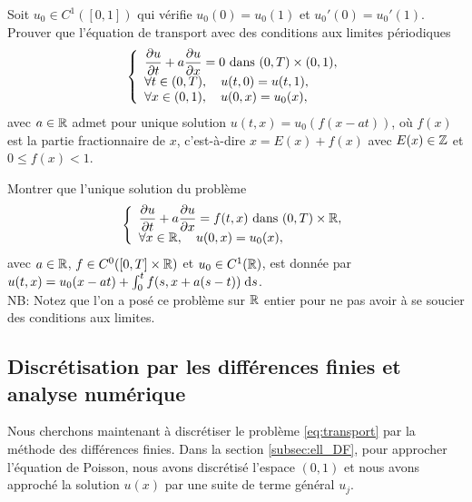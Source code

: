 \documentclass[12pt,a4paper,twoside]{article}
\begin{document}
\begin{exercise}
  \label{exo:carac_per}
  Soit $u_0 \in C^1([0,1])$ qui v\'erifie $u_0(0) = u_0(1)$ et $u_0'(0) = u_0'(1)$.
  Prouver que l'\'equation de transport avec des conditions aux limites p\'eriodiques
  \begin{equation}
    \label{eq:transport_per}
    \left\{
      \begin{array}{l}
        \dfrac{\partial u}{\partial t} + a \dfrac{\partial u}{\partial x} = 0 
        \text{ dans } (0,T) \times (0,1),
        \\
        \forall t \in (0,T), \quad u(t,0) = u(t,1) ,
        \\
        \forall x \in (0,1), \quad u(0,x) = u_0(x) ,
      \end{array}
    \right.
  \end{equation}
  avec $a\in \mathbb{R}$
  admet pour unique solution $u(t,x) = u_0(f(x-at))$,
  o\`u $f(x)$ est la partie fractionnaire de $x$,
  c'est-\`a-dire $x = E(x) + f(x)$ avec $E(x) \in \mathbb{Z}$
  et $0 \leq f(x) < 1$.
\end{exercise}

\begin{exercise}
  Montrer que l'unique solution du probl\`eme
  \begin{equation*}
    \left\{
      \begin{array}{l}
        \dfrac{\partial u}{\partial t} + a \dfrac{\partial u}{\partial x} = f(t,x)
        \text{ dans } (0,T) \times \mathbb{R},
        \\
        \forall x \in \mathbb{R}, \quad u(0,x) = u_0(x) ,
      \end{array}
    \right.
  \end{equation*}
  avec $a \in \mathbb{R}$, $f \in C^0([0,T] \times \mathbb{R})$ et $u_0 \in C^1(\mathbb{R})$,
  est donn\'ee par 
  $u(t,x) = u_0(x-at) + \int_0^t f(s,x+a(s-t)) \;\mathrm{d} s$.
  \\
  NB: Notez que l'on a pos\'e ce probl\`eme sur $\mathbb{R}$ entier pour ne pas avoir
  \`a se soucier des conditions aux limites.
\end{exercise}

\subsection{Discr\'etisation par les diff\'erences finies et analyse num\'erique}
\label{subsec:transport_DF}

Nous cherchons maintenant \`a discr\'etiser le probl\`eme \eqref{eq:transport}
par la m\'ethode des diff\'erences finies.
Dans la section \ref{subsec:ell_DF}, pour approcher l'\'equation de Poisson,
nous avons discr\'etis\'e l'espace $(0,1)$ et nous avons approch\'e la solution
$u(x)$ par une suite de terme g\'en\'eral $u_j$.
\end{document}
